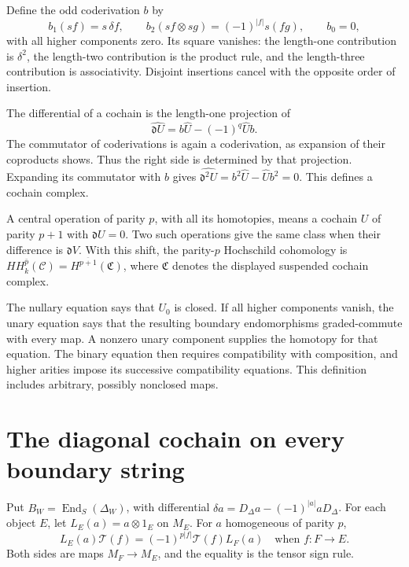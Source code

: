Define the odd coderivation \(b\) by
\[
 b_1(sf)=s\,\delta f,\qquad
 b_2(sf\otimes sg)=(-1)^{|f|}s(fg),\qquad b_0=0,
\]
with all higher components zero. Its square vanishes:
the length-one contribution is \(\delta^2\), the length-two
contribution is the product rule, and the length-three
contribution is associativity. Disjoint insertions cancel
with the opposite order of insertion.

The differential of a cochain is the length-one projection of
\begin{equation}
 \widehat{\mathfrak d U}
      =b\widehat U-(-1)^q\widehat U b .
 \label{eq:cc-differential}
\end{equation}
The commutator of coderivations is again a coderivation, as
expansion of their coproducts shows. Thus the right side is
determined by that projection. Expanding its commutator with
\(b\) gives
\(\widehat{\mathfrak d^2 U}=b^2\widehat U-\widehat U b^2=0\).
This defines a cochain complex.

A central operation of parity \(p\), with all its homotopies,
means a cochain \(U\) of parity \(p+1\) with
\(\mathfrak dU=0\). Two such operations give the same class
when their difference is \(\mathfrak dV\).
With this shift, the parity-\(p\) Hochschild cohomology is
\(HH_k^{\bar p}(\mathcal C)=H^{\overline{p+1}}(\mathfrak C)\),
where \(\mathfrak C\) denotes the displayed suspended cochain
complex.

The nullary equation says that \(U_0\) is closed. If all higher
components vanish, the unary equation says that the resulting
boundary endomorphisms graded-commute with every map. A nonzero
unary component supplies the homotopy for that equation.
The binary equation then requires compatibility with composition,
and higher arities impose its successive compatibility equations.
This definition includes arbitrary, possibly nonclosed maps.

\section{The diagonal cochain on every boundary string}
\label{sec:cc-comparison}

Put \(B_W=\operatorname{End}_S(\Delta_W)\), with differential
\(\delta a=D_\Delta a-(-1)^{|a|}aD_\Delta\).
For each object \(E\), let \(L_E(a)=a\otimes1_E\) on \(M_E\).
For \(a\) homogeneous of parity \(p\),
\[
 L_E(a)\mathcal T(f)=(-1)^{p|f|}
                  \mathcal T(f)L_F(a)
 \quad\text{when } f:F\to E.
\]
Both sides are maps \(M_F\to M_E\), and the equality is the
tensor sign rule.

